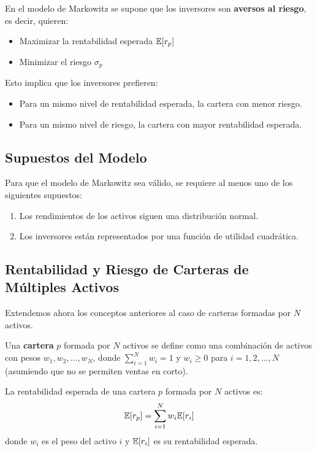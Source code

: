 \begin{definicion}
En el modelo de Markowitz se supone que los inversores son \textbf{aversos al riesgo}, es decir, quieren:
\begin{itemize}
\item Maximizar la rentabilidad esperada $\mathbb{E}[r_p]$
\item Minimizar el riesgo $\sigma_p$
\end{itemize}
\end{definicion}

Esto implica que los inversores prefieren:
\begin{itemize}
\item Para un mismo nivel de rentabilidad esperada, la cartera con menor riesgo.
\item Para un mismo nivel de riesgo, la cartera con mayor rentabilidad esperada.
\end{itemize}

\subsection{Supuestos del Modelo}

Para que el modelo de Markowitz sea válido, se requiere al menos uno de los siguientes supuestos:

\begin{enumerate}
\item Los rendimientos de los activos siguen una distribución normal.
\item Los inversores están representados por una función de utilidad cuadrática.
\end{enumerate}


\subsection{Rentabilidad y Riesgo de Carteras de Múltiples Activos}

Extendemos ahora los conceptos anteriores al caso de carteras formadas por $N$ activos.

\begin{definicion}
Una \textbf{cartera} $p$ formada por $N$ activos se define como una combinación de activos con pesos $w_1, w_2, \ldots, w_N$, donde $\sum_{i=1}^{N} w_i = 1$ y $w_i \geq 0$ para $i = 1, 2, \ldots, N$ (asumiendo que no se permiten ventas en corto).
\end{definicion}

\begin{teorema}
La rentabilidad esperada de una cartera $p$ formada por $N$ activos es:
\begin{equation}
\mathbb{E}[r_p] = \sum_{i=1}^{N} w_i \mathbb{E}[r_i]
\end{equation}
donde $w_i$ es el peso del activo $i$ y $\mathbb{E}[r_i]$ es su rentabilidad esperada.
\end{teorema}

